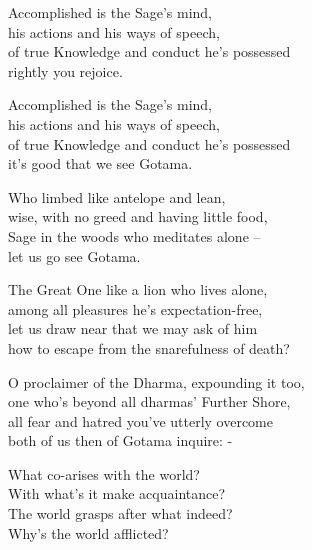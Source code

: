 \begin{MyDescription}{}
Accomplished is the Sage's mind,\\
his actions and his ways of speech,\\
of true Knowledge and conduct he's possessed\\
rightly you rejoice.
\end{MyDescription}     
   
\begin{MyDescription}{}
Accomplished is the Sage's mind,\\
his actions and his ways of speech,\\
of true Knowledge and conduct he's possessed\\
it's good that we see Gotama.
\end{MyDescription}     

\begin{MyDescription}{}
Who limbed like antelope and lean,\\
wise, with no greed and having little food,\\
Sage in the woods who meditates alone – \\
let us go see Gotama.
\end{MyDescription}     

\begin{MyDescription}{}
The Great One like a lion who lives alone,\\
among all pleasures he's expectation-free,\\
let us draw near that we may ask of him\\
how to escape from the snarefulness of death?
\end{MyDescription}     

\begin{MyDescription}{}
O proclaimer of the Dharma, expounding it too,\\
one who's beyond all dharmas' Further Shore,\\
all fear and hatred you've utterly overcome\\
both of us then of Gotama inquire: -	
\end{MyDescription}     

\begin{MyDescription}{}
What co-arises with the world?\\
With what's it make acquaintance?\\
The world grasps after what indeed?\\
Why's the world afflicted?
\end{MyDescription}     
   
